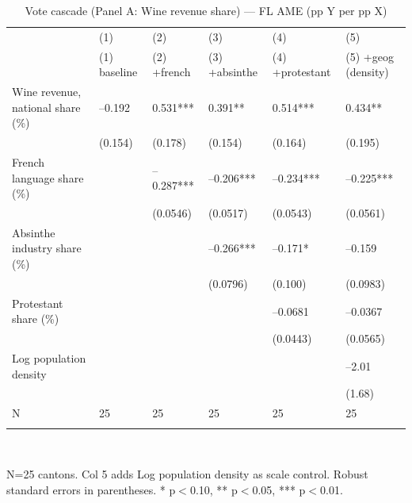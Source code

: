 \begin{table}[tbp] \centering
{}

\caption{Vote cascade (Panel A: Wine revenue share) --- FL AME (pp Y per pp X)}
\label{tab:T2_X3_FL}
\begin{tabularx}{\linewidth}{@{}lCCCCC@{}}

\toprule
&{(1)}&{(2)}&{(3)}&{(4)}&{(5)} \tabularnewline
 & (1) baseline & (2) +french & (3) +absinthe & (4) +protestant & (5) +geog (density) \tabularnewline 
\midrule \addlinespace[\belowrulesep]
Wine revenue, national share (\%)&--0.192&0.531***&0.391**&0.514***&0.434** \tabularnewline
&(0.154)&(0.178)&(0.154)&(0.164)&(0.195) \tabularnewline
French language share (\%)&&--0.287***&--0.206***&--0.234***&--0.225*** \tabularnewline
&&(0.0546)&(0.0517)&(0.0543)&(0.0561) \tabularnewline
Absinthe industry share (\%)&&&--0.266***&--0.171*&--0.159 \tabularnewline
&&&(0.0796)&(0.100)&(0.0983) \tabularnewline
Protestant share (\%)&&&&--0.0681&--0.0367 \tabularnewline
&&&&(0.0443)&(0.0565) \tabularnewline
Log population density&&&&&--2.01 \tabularnewline
&&&&&(1.68) \tabularnewline
\midrule N&25&25&25&25&25 \tabularnewline
\bottomrule \addlinespace[\belowrulesep]

\end{tabularx}
\\ \parbox{\linewidth}{\footnotesize N=25 cantons. Col 5 adds Log population density as scale control. Robust standard errors in parentheses. * p\(<\)0.10, ** p\(<\)0.05, *** p\(<\)0.01.}
\end{table}

